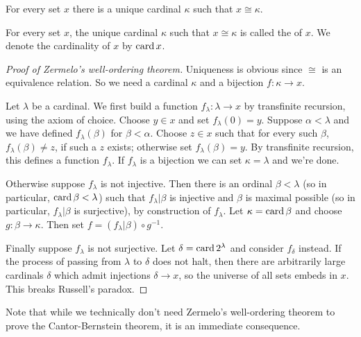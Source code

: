 \begin{theorem}
\label{well-ordering theorem}
For every set $x$ there is a unique cardinal $\kappa$ such that $x \cong \kappa$.
\end{theorem}

\begin{definition}
For every set $x$, the unique cardinal $\kappa$ such that $x \cong \kappa$ is called the  of $x$.
We denote the cardinality of $x$ by $\operatorname{card} x$.
\end{definition}

\begin{proof}[Proof of Zermelo's well-ordering theorem]
Uniqueness is obvious since $\cong$ is an equivalence relation.
So we need a cardinal $\kappa$ and a bijection $f: \kappa \to x$.

Let $\lambda$ be a cardinal. We first build a function $f_\lambda: \lambda \to x$ by transfinite recursion, using the axiom of choice.
Choose $y \in x$ and set $f_\lambda(0) = y$.
Suppose $\alpha < \lambda$ and we have defined $f_\lambda(\beta)$ for $\beta < \alpha$.
Choose $z \in x$ such that for every such $\beta$, $f_\lambda(\beta) \neq z$, if such a $z$ exists; otherwise set $f_\lambda(\beta) = y$.
By transfinite recursion, this defines a function $f_\lambda$. If $f_\lambda$ is a bijection we can set $\kappa = \lambda$ and we're done.

Otherwise suppose $f_\lambda$ is not injective. Then there is an ordinal $\beta < \lambda$ (so in particular, $\operatorname{card} \beta < \lambda$) such that $f_\lambda|\beta$ is injective and $\beta$ is maximal possible (so in particular, $f_\lambda|\beta$ is surjective), by construction of $f_\lambda$.
Let $\kappa = \operatorname{card} \beta$ and choose $g: \beta \to \kappa$.
Then set $f = (f_\lambda|\beta) \circ g^{-1}$.

Finally suppose $f_\lambda$ is not surjective. Let $\delta = \operatorname{card} 2^\lambda$ and consider $f_\delta$ instead.
If the process of passing from $\lambda$ to $\delta$ does not halt, then there are arbitrarily large cardinals $\delta$ which admit injections $\delta \to x$, so the universe of all sets embeds in $x$.
This breaks Russell's paradox.
\end{proof}

\begin{subsec}
Note that while we technically don't need Zermelo's well-ordering theorem to prove the Cantor-Bernstein theorem, it is an immediate consequence.
\end{subsec}

